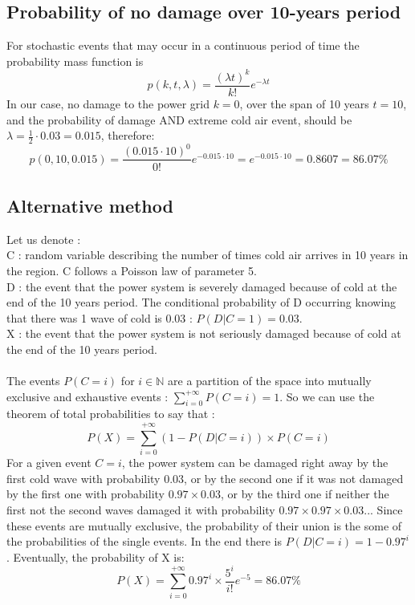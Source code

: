 \documentclass{article}
\begin{document}
\subsection{Probability of no damage over 10-years period}
For stochastic events that may occur in a continuous period of time the probability mass function is 
\begin{equation}
    p(k,t,\lambda)=\frac{(\lambda t)^k}{k!} e ^{-\lambda t}
\end{equation}
In our case, no damage to the power grid $k=0$, over the span of 10 years $t=10$, and the probability of damage AND extreme cold air event, should be $\lambda = \frac{1}{2} \cdot 0.03 = 0.015$, therefore:
\begin{equation}
    p(0,10,0.015)=\frac{(0.015 \cdot 10)^0}{0!} e ^{-0.015 \cdot 10} = e ^{-0.015 \cdot 10} = 0.8607 = 86.07\%
\end{equation}

\subsection{Alternative method}
Let us denote :\\
C : random variable describing the number of times cold air arrives in 10 years in the region. C follows a Poisson law of parameter 5.\\
D : the event that the power system is severely damaged because of cold at the end of the 10 years period. The conditional probability of D occurring knowing that there was 1 wave of cold is 0.03 : $P(D|C=1)=0.03$.\\
X : the event that the power system is not seriously damaged because of cold at the end of the 10 years period.\\
\\
The events $P(C=i)$ for $i \in \mathbb{N}$ are a partition of the space into mutually exclusive and exhaustive events : $\sum_{i=0}^{+\infty} P(C=i) = 1$. So we can use the theorem of total probabilities to say that :
\begin{equation}
    P(X)=\sum_{i=0}^{+\infty} (1-P(D|C=i)) \times P(C=i)
\end{equation}
For a given event $C=i$, the power system can be damaged right away by the first cold wave with probability $0.03$, or by the second one if it was not damaged by the first one with probability $0.97 \times 0.03$, or by the third one if neither the first not the second waves damaged it with probability $0.97 \times 0.97 \times 0.03$... Since these events are mutually exclusive, the probability of their union is the some of the probabilities of the single events. In the end there is $P(D|C=i)=1-0.97^i$.
Eventually, the probability of X is:
\begin{equation}
    P(X)=\sum_{i=0}^{+\infty} 0.97^i \times \frac{5^i}{i!} e^{-5} = 86.07\%
\end{equation}
\end{document}
